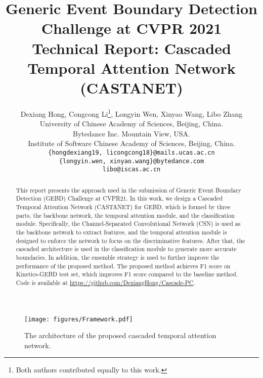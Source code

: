\documentclass[final]{cvpr}
\begin{document}
\title{Generic Event Boundary Detection Challenge at CVPR 2021 \\
Technical Report: Cascaded Temporal Attention Network (CASTANET)
}

\author{Dexiang Hong, Congcong Li\thanks{Both authors contributed equally to this work.}, Longyin Wen, Xinyao Wang, Libo Zhang \\
University of Chinese Academy of Sciences, Beijing, China.\\
Bytedance Inc. Mountain View, USA.\\
Institute of Software Chinese Academy of Sciences, Beijing, China.\\
{\tt\small \{hongdexiang19, licongcong18\}@mails.ucas.ac.cn} \\
{\tt\small \{longyin.wen, xinyao.wang\}@bytedance.com} \\
{\tt\small libo@iscas.ac.cn}
}

\maketitle

\begin{abstract}
This report presents the approach used in the submission of Generic Event Boundary Detection (GEBD) Challenge at CVPR21. In this work, we design a Cascaded Temporal Attention Network (CASTANET) for GEBD, which is formed by three parts, the backbone network, the temporal attention module, and the classification module. Specifically, the Channel-Separated Convolutional Network (CSN) is used as the backbone network to extract features, and the temporal attention module is designed to enforce the network to focus on the discriminative features. After that, the cascaded architecture is used in the classification module to generate more accurate boundaries. In addition, the ensemble strategy is used to further improve the performance of the proposed method. The proposed method achieves  F1 score on Kinetics-GEBD test set, which improves  F1 score compared to the baseline method. Code is available at \href{https://github.com/DexiangHong/Cascade-PC}{https://github.com/DexiangHong/Cascade-PC}.
\end{abstract}


\begin{figure*}
\begin{center}
\texttt{[image: figures/Framework.pdf]}
\end{center}
  \caption{The architecture of the proposed cascaded temporal attention network.}
\label{fig:framework}
\end{figure*}
\end{document}
